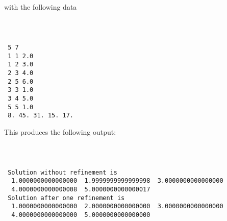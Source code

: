 \documentclass{galahad}
\begin{document}
with the following data
{\tt
\begin{verbatim}

 5 7 
 1 1 2.0 
 1 2 3.0 
 2 3 4.0 
 2 5 6.0 
 3 3 1.0 
 3 4 5.0 
 5 5 1.0 
 8. 45. 31. 15. 17. 

\end{verbatim}
}
This produces the following output:
{\tt
\begin{verbatim}

 Solution without refinement is 
  1.0000000000000000  1.9999999999999998  3.0000000000000000 
  4.0000000000000008  5.0000000000000017 
 Solution after one refinement is 
  1.0000000000000000  2.0000000000000000  3.0000000000000000 
  4.0000000000000000  5.0000000000000000 

\end{verbatim}
}
\end{document}
